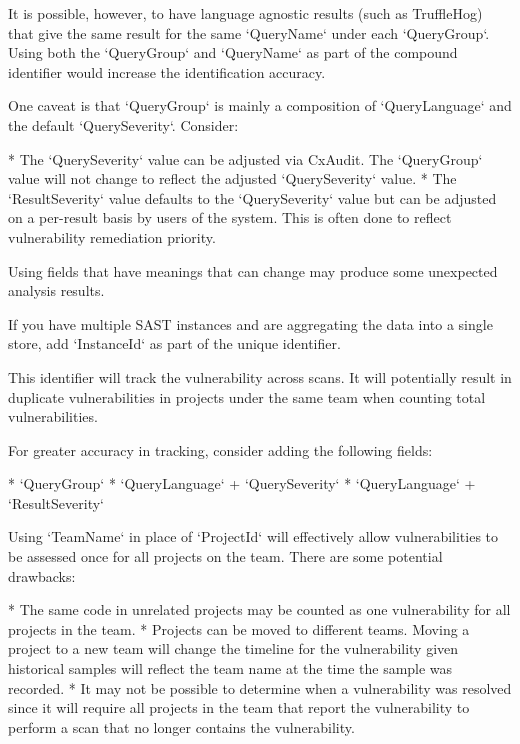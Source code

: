 It is possible, however, to have language agnostic results (such as TruffleHog) that give the same result for the same `QueryName` under each `QueryGroup`.  Using both the `QueryGroup` and `QueryName` as part of the compound identifier would increase the identification accuracy.

One caveat is that `QueryGroup` is mainly a composition of `QueryLanguage` and the default `QuerySeverity`.  Consider:

* The `QuerySeverity` value can be adjusted via CxAudit.  The `QueryGroup` value will not change to reflect the adjusted `QuerySeverity` value.
* The `ResultSeverity` value defaults to the `QuerySeverity` value but can be adjusted on a per-result basis by users of the system.  This is often done to reflect vulnerability remediation priority.  

Using fields that have meanings that can change may produce some unexpected analysis results.


If you have multiple SAST instances and are aggregating the data into a single store, add `InstanceId` as part of the unique identifier.




This identifier will track the vulnerability across scans.  It will potentially result in duplicate vulnerabilities in projects under the same team when counting total vulnerabilities.  

For greater accuracy in tracking, consider adding the following fields:

* `QueryGroup`
* `QueryLanguage` + `QuerySeverity`
* `QueryLanguage` + `ResultSeverity`


Using `TeamName` in place of `ProjectId` will effectively allow vulnerabilities to be assessed once for all projects on the team.  There are some potential drawbacks:

* The same code in unrelated projects may be counted as one vulnerability for all projects in the team.
* Projects can be moved to different teams.  Moving a project to a new team will change the timeline for the vulnerability given historical samples will reflect the team name at the time the sample was recorded.
* It may not be possible to determine when a vulnerability was resolved since it will require all projects in the team that report the vulnerability to perform a scan that no longer contains the vulnerability.  

